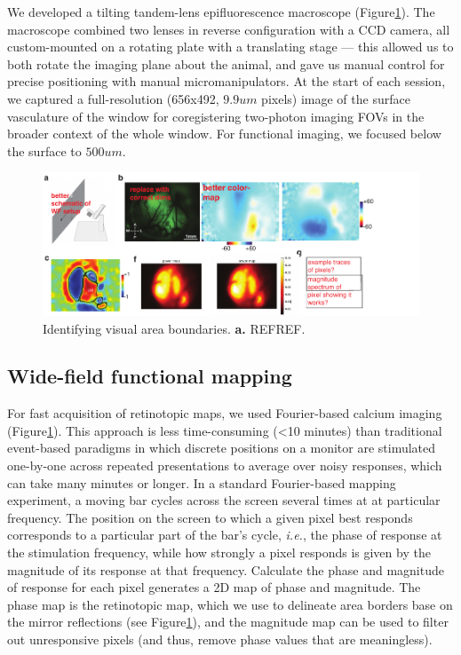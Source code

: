 We developed a tilting tandem-lens epifluorescence macroscope\cite{Ratzlaff1991}  (Figure\ref{fig:retino_mapping}). The macroscope combined two lenses in reverse configuration with a CCD camera, all custom-mounted on a rotating plate with a translating stage --- this allowed us to both rotate the imaging plane about the animal, and gave us manual control for precise positioning with manual micromanipulators. At the start of each session, we captured a full-resolution (656x492, $9.9um$ pixels) image of the surface vasculature of the window for coregistering two-photon imaging FOVs in the broader context of the whole window. For functional imaging, we focused below the surface to $500um$. 

\begin{figure}
    \includegraphics[width=\textwidth]{figures/chapter_2/fig_2-5_retino_mapping/retino_mapping.pdf}
    \vspace{.1in}
    \caption[Retinotopic mapping]{Identifying visual area boundaries. \textbf{a.} REFREF.
    \label{fig:retino_mapping}}
\end{figure}

\subsection{Wide-field functional mapping}
For fast acquisition of retinotopic maps, we used Fourier-based calcium imaging\cite{Kalatsky2003} (Figure\ref{fig:retino_mapping}). This approach is less time-consuming (<10 minutes) than traditional event-based paradigms in which discrete positions on a monitor are stimulated one-by-one across repeated presentations to average over noisy responses, which can take many minutes or longer. In a standard Fourier-based mapping experiment, a moving bar cycles across the screen several times at at particular frequency. The position on the screen to which a given pixel best responds corresponds to a particular part of the bar's cycle, \textit{i.e.}, the phase of response at the stimulation frequency, while how strongly a pixel responds is given by the magnitude of its response at that frequency. Calculate the phase and magnitude of response for each pixel generates a 2D map of phase and magnitude. The phase map is the retinotopic map, which we use to delineate area borders base on the mirror reflections (see Figure\ref{fig:retino_mapping}), and the magnitude map can be used to filter out unresponsive pixels (and thus, remove phase values that are meaningless). 

